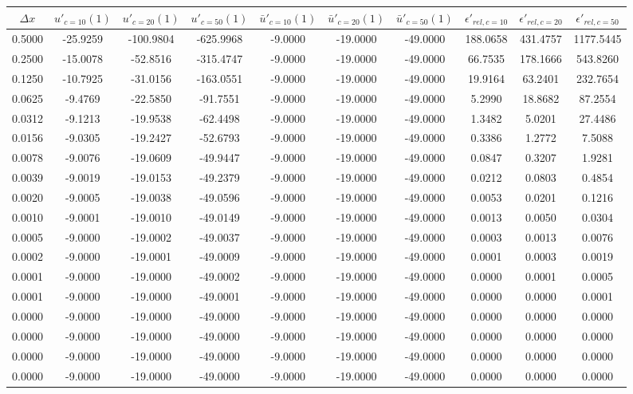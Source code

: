 \begin{tabular}{|c|c|c|c|c|c|c|c|c|c|}
\hline
\textbf{$\Delta x$}&\textbf{$u'_{c=10}(1)$}&\textbf{$u'_{c=20}(1)$}&\textbf{$u'_{c=50}(1)$}&\textbf{$\bar{u}'_{c=10}(1)$}&\textbf{$\bar{u}'_{c=20}(1)$}&\textbf{$\bar{u}'_{c=50}(1)$}&\textbf{$\epsilon'_{rel,c=10}$}&\textbf{$\epsilon'_{rel,c=20}$}&\textbf{$\epsilon'_{rel,c=50}$}\\\hline
0.5000&-25.9259&-100.9804&-625.9968&-9.0000&-19.0000&-49.0000&188.0658&431.4757&1177.5445\\\hline
0.2500&-15.0078&-52.8516&-315.4747&-9.0000&-19.0000&-49.0000&66.7535&178.1666&543.8260\\\hline
0.1250&-10.7925&-31.0156&-163.0551&-9.0000&-19.0000&-49.0000&19.9164&63.2401&232.7654\\\hline
0.0625&-9.4769&-22.5850&-91.7551&-9.0000&-19.0000&-49.0000&5.2990&18.8682&87.2554\\\hline
0.0312&-9.1213&-19.9538&-62.4498&-9.0000&-19.0000&-49.0000&1.3482&5.0201&27.4486\\\hline
0.0156&-9.0305&-19.2427&-52.6793&-9.0000&-19.0000&-49.0000&0.3386&1.2772&7.5088\\\hline
0.0078&-9.0076&-19.0609&-49.9447&-9.0000&-19.0000&-49.0000&0.0847&0.3207&1.9281\\\hline
0.0039&-9.0019&-19.0153&-49.2379&-9.0000&-19.0000&-49.0000&0.0212&0.0803&0.4854\\\hline
0.0020&-9.0005&-19.0038&-49.0596&-9.0000&-19.0000&-49.0000&0.0053&0.0201&0.1216\\\hline
0.0010&-9.0001&-19.0010&-49.0149&-9.0000&-19.0000&-49.0000&0.0013&0.0050&0.0304\\\hline
0.0005&-9.0000&-19.0002&-49.0037&-9.0000&-19.0000&-49.0000&0.0003&0.0013&0.0076\\\hline
0.0002&-9.0000&-19.0001&-49.0009&-9.0000&-19.0000&-49.0000&0.0001&0.0003&0.0019\\\hline
0.0001&-9.0000&-19.0000&-49.0002&-9.0000&-19.0000&-49.0000&0.0000&0.0001&0.0005\\\hline
0.0001&-9.0000&-19.0000&-49.0001&-9.0000&-19.0000&-49.0000&0.0000&0.0000&0.0001\\\hline
0.0000&-9.0000&-19.0000&-49.0000&-9.0000&-19.0000&-49.0000&0.0000&0.0000&0.0000\\\hline
0.0000&-9.0000&-19.0000&-49.0000&-9.0000&-19.0000&-49.0000&0.0000&0.0000&0.0000\\\hline
0.0000&-9.0000&-19.0000&-49.0000&-9.0000&-19.0000&-49.0000&0.0000&0.0000&0.0000\\\hline
0.0000&-9.0000&-19.0000&-49.0000&-9.0000&-19.0000&-49.0000&0.0000&0.0000&0.0000\\\hline
\end{tabular}
